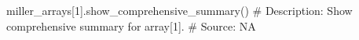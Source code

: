 miller_arrays[1].show_comprehensive_summary()
# Description:  Show comprehensive summary for array[1]. 
# Source:  NA

